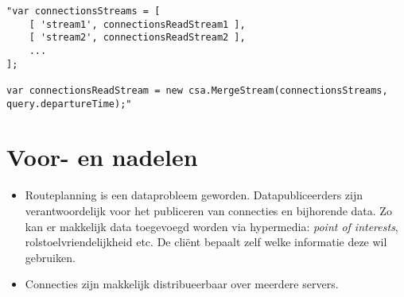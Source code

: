 \begin{lstlisting}[label=vbclient,caption=Voorbeeldcode van een merger. Deze voegt meerdere stromen van connecties samen.]
"var connectionsStreams = [
    [ 'stream1', connectionsReadStream1 ],
    [ 'stream2', connectionsReadStream2 ],
    ...
];

var connectionsReadStream = new csa.MergeStream(connectionsStreams, query.departureTime);"
\end{lstlisting}

\section{Voor- en nadelen}

\begin{itemize}
\item Routeplanning is een dataprobleem geworden. Datapubliceerders zijn verantwoordelijk voor het publiceren van connecties en bijhorende data. Zo kan er makkelijk data toegevoegd worden via hypermedia: \textit{point of interests}, rolstoelvriendelijkheid etc. De cli\"ent bepaalt zelf welke informatie deze wil gebruiken.
\item Connecties zijn makkelijk distribueerbaar over meerdere servers. 
\end{itemize}